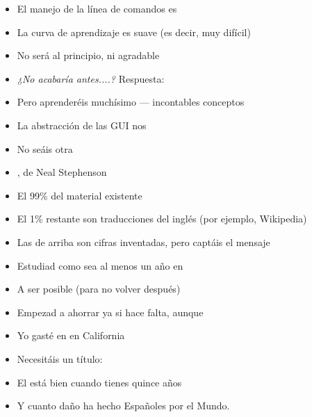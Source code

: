 \documentclass[14pt]{beamer}
\begin{document}

\begin{frame}{}
  \begin{block}{}\centering
    \Large {}
  \end{block}
  \begin{itemize}
    \item El manejo de la línea de comandos es 
    \item La curva de aprendizaje es suave (es decir, muy difícil)
    \item No será  al principio, ni agradable
    \item \emph{¿No acabaría antes....?} Respuesta: 
    \item Pero aprenderéis muchísimo — incontables conceptos
    \item La abstracción de las GUI nos 
    \item No seáis otra 
    \item {}, de  Neal Stephenson
  \end{itemize}
\end{frame}

\begin{frame}{}
  \begin{block}{}\centering
    \Large {}
  \end{block}
  \begin{itemize}
    \item El 99\% del material existente 
    \item El 1\% restante son traducciones del inglés (por ejemplo, Wikipedia)
    \item Las de arriba son cifras inventadas, pero captáis el mensaje
    \item Estudiad como sea al menos un año en 
    \item A ser posible  (para no volver después)
    \item Empezad a ahorrar ya si hace falta, aunque 
    \item Yo gasté  en  en California
    \item Necesitáis un título: 
    \item El  está bien cuando tienes quince años
    \item Y cuanto daño ha hecho Españoles por el Mundo.
  \end{itemize}
\end{frame}
\end{document}

